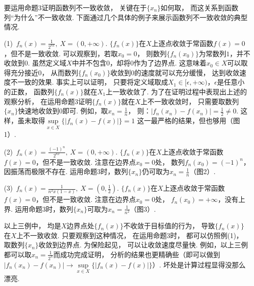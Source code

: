 要运用命题3证明函数列不一致收敛，
关键在于$\{ x_n \}$如何取，
而这关系到函数列“为什么”不一致收敛.
下面通过几个具体的例子来展示函数列不一致收敛的典型情况.\vspace{0.5em}

(1)~$f_n(x) = \frac{1}{2^{nx}},~X = (0,+\infty)$.
$\{ f_n (x)\} $在$X$上逐点收敛于常函数$f(x) = 0$，但不是一致收敛.
可以观察到，若取$x_0 = 0$，
则数列$\{ f_n(x_0)\}$为常数列$1$，并不收敛到$0$.
虽然定义域$X$中并不包含$0$，却将$0$作为了边界点.
这意味着$x_0 \in X$可以取得充分接近$0$，
从而数列$\{ f_n(x_0)\}$收敛到$0$的速度就可以充分缓慢，
达到收敛速度不一致的效果.
事实上可以证明，
只要将定义域取成$X_1 \in [\epsilon, +\infty)$，$\epsilon$是任意小的正数，
函数列$\{ f_n (x)\}$就在$X_1$上一致收敛了.
为了在证明过程中表现出上述的观察分析，
在运用命题3证明$\{ f_n (x)\}$就在$X$上不一致收敛时，
只需要取数列$\{ x_n \}$快速地收敛到$0$即可.
例如，取$x_n = \frac{1}{n}$，
则：$|f_n(x_n) - f(x_n)| = \frac{1}{2} \ne 0$.
这样，虽未取得$\mathop{sup}\limits_{x\in X}\{ |f_n(x) - f(x)| \} = 1$
这一最严格的结果，但也够用（图1）.\vspace{0.5em}

(2)~$f_n(x) = \frac{(-1)^n}{2^{nx}},~X = (0,+\infty)$.
$\{ f_n (x)\} $在$X$上逐点收敛于常函数$f(x) = 0$，但不是一致收敛.
注意在边界点$x_0 = 0$处，
数列$f_n(x_0) = (-1)^n$，因振荡而极限不存在.
运用命题3时，数列$\{ x_n \}$仍可取为$x_n = \frac{1}{n}$（图2）.\vspace{0.5em}

(3)~$f_n(x) = \frac{1}{n^2 x(1-x)},~X = (0,\frac{1}{2})$.
$\{ f_n (x)\} $在$X$上逐点收敛于常函数$f(x) = 0$，但不是一致收敛.
注意在边界点$x_0 = 0$处，
$f_n(x_0) = +\infty$，没有上界.
运用命题3时，数列$\{ x_n \}$可取为$x_n = \frac{1}{n^2}$（图3）.\vspace{0.5em}

以上三例中，
均是$X$边界点处$\{f_n(x)\}$不收敛于目标值的行为，
导致$\{f_n(x)\}$在$X$上不一致收敛.
只要观察到这种情况，
在运用命题3时，
都可以仿照例(1)，
取数列$\{ x_n \}$收敛到边界点.
为保险起见，
可以让收敛速度尽量快.
例如，以上三例都可以取$x_n = \frac{1}{2^n}$而成功完成证明，
分析的结果也更精确些（即可以做到$|f_n(x_n) - f(x_n)| \to \mathop{sup}\limits_{x\in X}\{ |f_n(x) - f(x)| \}$）.
坏处是计算过程显得没那么漂亮. \vspace{1em}

